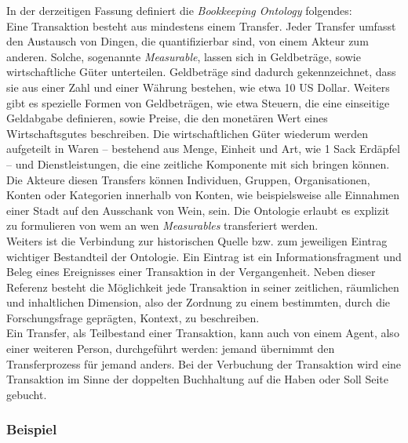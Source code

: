 \documentclass[12pt,a4paper]{article}
\begin{document}
In der derzeitigen Fassung definiert die \textit{Bookkeeping Ontology} folgendes:
\\
Eine Transaktion besteht aus mindestens einem Transfer. Jeder Transfer umfasst den Austausch von Dingen, die quantifizierbar sind, von einem Akteur zum anderen. Solche, sogenannte \textit{Measurable}, lassen sich in Geldbeträge, sowie wirtschaftliche Güter unterteilen. Geldbeträge sind dadurch gekennzeichnet, dass sie aus einer Zahl und einer Währung bestehen, wie etwa 10 US Dollar. Weiters gibt es spezielle Formen von Geldbeträgen, wie etwa Steuern, die eine einseitige Geldabgabe definieren, sowie Preise, die den monetären Wert eines Wirtschaftsgutes beschreiben. Die wirtschaftlichen Güter wiederum werden aufgeteilt in Waren -- bestehend aus Menge, Einheit und Art, wie 1 Sack Erdäpfel -- und Dienstleistungen, die eine zeitliche Komponente mit sich bringen können. Die Akteure diesen Transfers können Individuen, Gruppen, Organisationen, Konten oder Kategorien innerhalb von Konten, wie beispielsweise alle Einnahmen einer Stadt auf den Ausschank von Wein, sein. Die Ontologie erlaubt es explizit zu formulieren von wem an wen \textit{Measurables} transferiert werden.
\\
Weiters ist die Verbindung zur historischen Quelle bzw. zum jeweiligen Eintrag wichtiger Bestandteil der Ontologie. Ein Eintrag ist ein Informationsfragment und Beleg eines Ereignisses einer Transaktion in der Vergangenheit. Neben dieser Referenz besteht die Möglichkeit jede Transaktion in seiner zeitlichen, räumlichen und inhaltlichen Dimension, also der Zordnung zu einem bestimmten, durch die Forschungsfrage geprägten, Kontext, zu beschreiben.
\\
Ein Transfer, als Teilbestand einer Transaktion, kann auch von einem Agent, also einer weiteren Person, durchgeführt werden: jemand übernimmt den Transferprozess für jemand anders. Bei der Verbuchung der Transaktion wird eine Transaktion im Sinne der doppelten Buchhaltung auf die Haben oder Soll Seite gebucht. 


\subsubsection{Beispiel}
\label{Beispiel}
\end{document}

